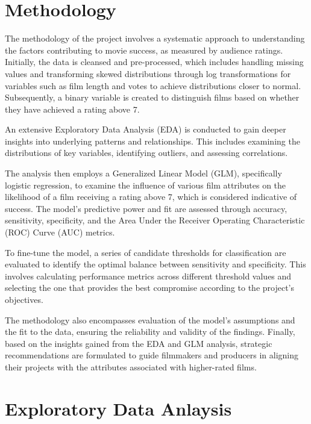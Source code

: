 \documentclass[
  11pt,
]{article}
\begin{document}
\hypertarget{methodology}{%
\section{Methodology}\label{methodology}}

The methodology of the project involves a systematic approach to
understanding the factors contributing to movie success, as measured by
audience ratings. Initially, the data is cleansed and pre-processed,
which includes handling missing values and transforming skewed
distributions through log transformations for variables such as film
length and votes to achieve distributions closer to normal.
Subsequently, a binary variable is created to distinguish films based on
whether they have achieved a rating above 7.

An extensive Exploratory Data Analysis (EDA) is conducted to gain deeper
insights into underlying patterns and relationships. This includes
examining the distributions of key variables, identifying outliers, and
assessing correlations.

The analysis then employs a Generalized Linear Model (GLM), specifically
logistic regression, to examine the influence of various film attributes
on the likelihood of a film receiving a rating above 7, which is
considered indicative of success. The model's predictive power and fit
are assessed through accuracy, sensitivity, specificity, and the Area
Under the Receiver Operating Characteristic (ROC) Curve (AUC) metrics.

To fine-tune the model, a series of candidate thresholds for
classification are evaluated to identify the optimal balance between
sensitivity and specificity. This involves calculating performance
metrics across different threshold values and selecting the one that
provides the best compromise according to the project's objectives.

The methodology also encompasses evaluation of the model's assumptions
and the fit to the data, ensuring the reliability and validity of the
findings. Finally, based on the insights gained from the EDA and GLM
analysis, strategic recommendations are formulated to guide filmmakers
and producers in aligning their projects with the attributes associated
with higher-rated films.

\hypertarget{exploratory-data-anlaysis}{%
\section{Exploratory Data Anlaysis}\label{exploratory-data-anlaysis}}
\end{document}
